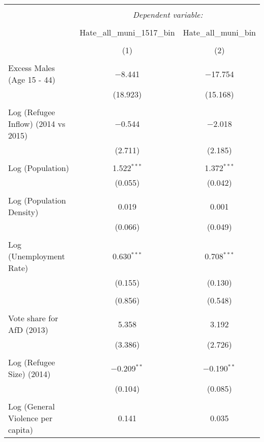 
\begin{table}[!htbp] \centering 
  \caption{} 
  \label{} 
\begin{tabular}{@{\extracolsep{5pt}}lcc} 
\\[-1.8ex]\hline 
\hline \\[-1.8ex] 
 & \multicolumn{2}{c}{\textit{Dependent variable:}} \\ 
\cline{2-3} 
\\[-1.8ex] & Hate\_all\_muni\_1517\_bin & Hate\_all\_muni\_bin \\ 
\\[-1.8ex] & (1) & (2)\\ 
\hline \\[-1.8ex] 
 Excess Males (Age 15 - 44) & $-$8.441 & $-$17.754 \\ 
  & (18.923) & (15.168) \\ 
  & & \\ 
 Log (Refugee Inflow) (2014 vs 2015) & $-$0.544 & $-$2.018 \\ 
  & (2.711) & (2.185) \\ 
  & & \\ 
 Log (Population) & 1.522$^{***}$ & 1.372$^{***}$ \\ 
  & (0.055) & (0.042) \\ 
  & & \\ 
 Log (Population Density) & 0.019 & 0.001 \\ 
  & (0.066) & (0.049) \\ 
  & & \\ 
 Log (Unemployment Rate) & 0.630$^{***}$ & 0.708$^{***}$ \\ 
  & (0.155) & (0.130) \\ 
  & & \\ 
  & (0.856) & (0.548) \\ 
  & & \\ 
 Vote share for AfD (2013) & 5.358 & 3.192 \\ 
  & (3.386) & (2.726) \\ 
  & & \\ 
 Log (Refugee Size) (2014) & $-$0.209$^{**}$ & $-$0.190$^{**}$ \\ 
  & (0.104) & (0.085) \\ 
  & & \\ 
 Log (General Violence per capita) & 0.141 & 0.035 \\ 

\end{tabular}
\end{table}
